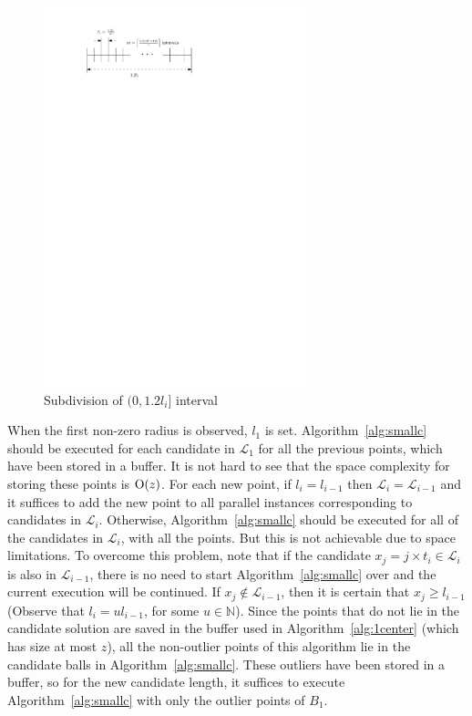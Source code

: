 \documentclass[envcountsame]{cls/cccg15}
\newcommand{\cO}{\ensuremath{{\rm O}}}
\newcommand{\gee}{\geqslant}
\renewcommand{\ge}{\gee}
\begin{document}
\begin{figure}[h]
	\centering
	\includegraphics[width=21em]{figs/findr}
	\caption{Subdivision of $(0, 1.2 l_i]$ interval}
	\label{fig:findr}
\end{figure}


When the first non-zero radius is observed, $l_1$ is set. Algorithm~\ref{alg:smallc} should be executed for each candidate in $\mathcal{L}_1$ for all the previous points, which have been stored in a buffer. It is not hard to see that the space complexity for storing these points is $\cO(z)$. For each new point, if $l_i=l_{i-1}$ then $\mathcal{L}_i = \mathcal{L}_{i-1}$ and it suffices to add the new point to all parallel instances corresponding to candidates in $\mathcal{L}_i$. Otherwise, Algorithm~\ref{alg:smallc} should be executed for all of the candidates in $\mathcal{L}_i$, with all the points. But this is not achievable due to space limitations. To overcome this problem, note that if the candidate $x_j=j \times t_i \in \mathcal{L}_i$ is also in $\mathcal{L}_{i-1}$, there is no need to start Algorithm~\ref{alg:smallc} over and the current execution will be continued. If $x_j \notin \mathcal{L}_{i-1}$, then it is certain that $x_j \ge l_{i - 1}$ (Observe that $l_i=ul_{i-1}$, for some $u\in \mathbb{N}$). Since the points that do not lie in the candidate solution are saved in the buffer used in Algorithm~\ref{alg:1center} (which has size at most $z$), all the non-outlier points of this algorithm lie in the candidate balls in Algorithm~\ref{alg:smallc}. These outliers have been stored in a buffer, so for the new candidate length, it suffices to execute Algorithm~\ref{alg:smallc} with only the outlier points of $B_1$.
\end{document}
